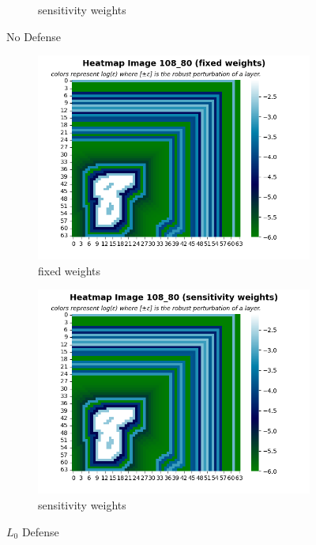 \begin{figure}
\begin{subfigure}[b]{0.4\textwidth}
             \caption{sensitivity weights}
             \label{sub-fig:No defense SW}
         \end{subfigure}
         \caption{No Defense}
         \label{fig:No defense}
     \end{figure}
    \begin{figure}
         \centering
         \begin{subfigure}[b]{0.4\textwidth}
             \centering
             \includegraphics[width=\textwidth]{l0_defense_fixed_weights.png}
             \caption{fixed weights}
             \label{sub-fig:L0 defense FW}
         \end{subfigure}
         \hfill
         \begin{subfigure}[b]{0.4\textwidth}
             \centering
             \includegraphics[width=\textwidth]{l0_defense_sensitivity_weights.png}
             \caption{sensitivity weights}
             \label{sub-fig:L0 defense SW}
         \end{subfigure}
         \caption{$L_0$ Defense}
         \label{fig:L0 defense}
    \end{figure}

